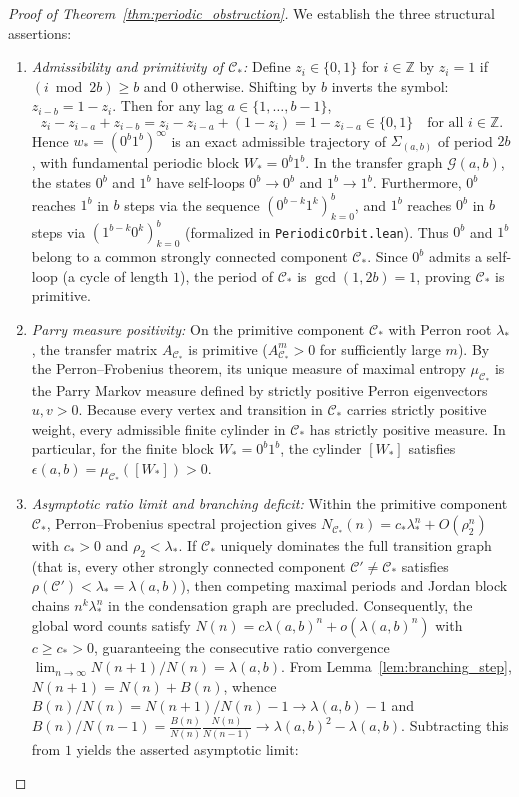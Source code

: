 \documentclass[11pt,reqno]{amsart}
\theoremstyle{plain}
\theoremstyle{definition}
\theoremstyle{remark}
\newcommand{\Z}{\mathbb{Z}}
\begin{document}
\begin{proof}[Proof of Theorem~\ref{thm:periodic_obstruction}]
We establish the three structural assertions:
\begin{enumerate}\setlength{\itemsep}{0pt}
    \item \emph{Admissibility and primitivity of $\mathcal{C}_*$:} Define $z_i \in \{0, 1\}$ for $i \in \Z$ by $z_i = 1$ if $(i \bmod 2b) \ge b$ and $0$ otherwise. Shifting by $b$ inverts the symbol: $z_{i-b} = 1 - z_i$. Then for any lag $a \in \{1, \dots, b-1\}$,
    \begin{equation}
    z_i - z_{i-a} + z_{i-b} = z_i - z_{i-a} + (1 - z_i) = 1 - z_{i-a} \in \{0, 1\} \quad \text{for all } i \in \Z.
    \end{equation}
    Hence $w_* = (0^b 1^b)^\infty$ is an exact admissible trajectory of $\Sigma_{(a, b)}$ of period $2b$, with fundamental periodic block $W_* = 0^b 1^b$.
    In the transfer graph $\mathcal{G}(a, b)$, the states $0^b$ and $1^b$ have self-loops $0^b \to 0^b$ and $1^b \to 1^b$. Furthermore, $0^b$ reaches $1^b$ in $b$ steps via the sequence $(0^{b-k} 1^k)_{k=0}^b$, and $1^b$ reaches $0^b$ in $b$ steps via $(1^{b-k} 0^k)_{k=0}^b$ (formalized in \texttt{PeriodicOrbit.lean}). Thus $0^b$ and $1^b$ belong to a common strongly connected component $\mathcal{C}_*$. Since $0^b$ admits a self-loop (a cycle of length $1$), the period of $\mathcal{C}_*$ is $\gcd(1, 2b) = 1$, proving $\mathcal{C}_*$ is primitive.
    \item \emph{Parry measure positivity:} On the primitive component $\mathcal{C}_*$ with Perron root $\lambda_*$, the transfer matrix $A_{\mathcal{C}_*}$ is primitive ($A_{\mathcal{C}_*}^m > 0$ for sufficiently large $m$). By the Perron--Frobenius theorem, its unique measure of maximal entropy $\mu_{\mathcal{C}_*}$ is the Parry Markov measure defined by strictly positive Perron eigenvectors $u, v > 0$. Because every vertex and transition in $\mathcal{C}_*$ carries strictly positive weight, every admissible finite cylinder in $\mathcal{C}_*$ has strictly positive measure. In particular, for the finite block $W_* = 0^b 1^b$, the cylinder $[W_*]$ satisfies $\epsilon(a, b) = \mu_{\mathcal{C}_*}([W_*]) > 0$.
    \item \emph{Asymptotic ratio limit and branching deficit:} Within the primitive component $\mathcal{C}_*$, Perron--Frobenius spectral projection gives $N_{\mathcal{C}_*}(n) = c_* \lambda_*^n + O(\rho_2^n)$ with $c_* > 0$ and $\rho_2 < \lambda_*$. If $\mathcal{C}_*$ uniquely dominates the full transition graph (that is, every other strongly connected component $\mathcal{C}' \ne \mathcal{C}_*$ satisfies $\rho(\mathcal{C}') < \lambda_* = \lambda(a, b)$), then competing maximal periods and Jordan block chains $n^k \lambda_*^n$ in the condensation graph are precluded. Consequently, the global word counts satisfy $N(n) = c \lambda(a, b)^n + o(\lambda(a, b)^n)$ with $c \ge c_* > 0$, guaranteeing the consecutive ratio convergence $\lim_{n \to \infty} N(n+1)/N(n) = \lambda(a, b)$. From Lemma~\ref{lem:branching_step}, $N(n+1) = N(n) + B(n)$, whence $B(n)/N(n) = N(n+1)/N(n) - 1 \to \lambda(a, b) - 1$ and $B(n)/N(n-1) = \frac{B(n)}{N(n)} \frac{N(n)}{N(n-1)} \to \lambda(a, b)^2 - \lambda(a, b)$. Subtracting this from $1$ yields the asserted asymptotic limit:

\end{enumerate}
\end{proof}
\end{document}
